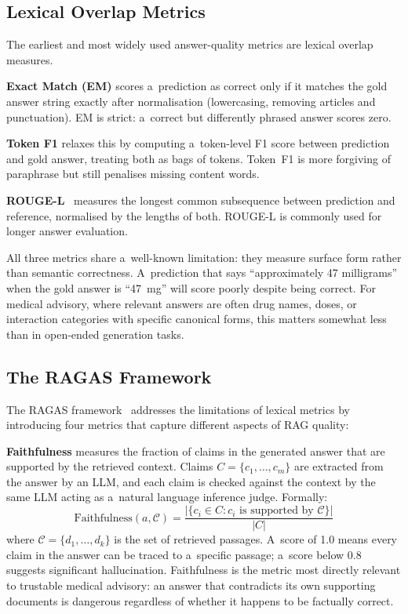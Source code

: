 \subsection{Lexical Overlap Metrics}

The earliest and most widely used answer-quality metrics are lexical overlap measures.

\textbf{Exact Match (EM)} scores a~prediction as correct only if it matches the
gold answer string exactly after normalisation (lowercasing, removing articles and
punctuation).
EM is strict: a~correct but differently phrased answer scores zero.

\textbf{Token F1} relaxes this by computing a~token-level F1 score between
prediction and gold answer, treating both as bags of tokens.
Token~F1 is more forgiving of paraphrase but still penalises missing content words.

\textbf{ROUGE-L}~\cite{lin2004rouge} measures the longest common subsequence between
prediction and reference, normalised by the lengths of both.
ROUGE-L is commonly used for longer answer evaluation.

All three metrics share a~well-known limitation: they measure surface form rather
than semantic correctness.
A~prediction that says ``approximately 47 milligrams'' when the gold answer is ``47~mg''
will score poorly despite being correct.
For medical advisory, where relevant answers are often drug names, doses, or
interaction categories with specific canonical forms, this matters somewhat less
than in open-ended generation tasks.

\subsection{The RAGAS Framework}

The RAGAS framework~\cite{es2023ragas} addresses the limitations of lexical metrics
by introducing four metrics that capture different aspects of RAG quality:

\textbf{Faithfulness} measures the fraction of claims in the generated answer that
are supported by the retrieved context.
Claims $C = \{c_1, \ldots, c_m\}$ are extracted from the answer by an LLM,
and each claim is checked against the context by the same LLM acting as a~natural
language inference judge.
Formally:
\begin{equation}
  \text{Faithfulness}(a, \mathcal{C}) =
    \frac{\bigl|\{c_i \in C : c_i \text{ is supported by } \mathcal{C}\}\bigr|}{|C|}
  \label{eq:faithfulness}
\end{equation}
where $\mathcal{C} = \{d_1,\ldots,d_k\}$ is the set of retrieved passages.
A~score of 1.0 means every claim in the answer can be traced to a~specific passage;
a~score below 0.8 suggests significant hallucination.
Faithfulness is the metric most directly relevant to trustable medical advisory:
an answer that contradicts its own supporting documents is dangerous regardless of
whether it happens to be factually correct.

